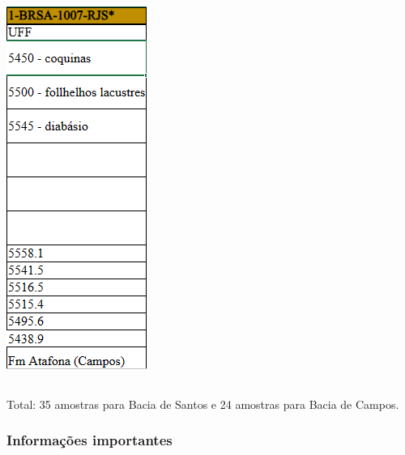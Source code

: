 \documentclass[aspectratio=169]{beamer} %
\begin{document}
{{\begin{frame}
\begin{columns}[c]
			\centering
			\includegraphics[scale=0.4]{images/amostragem1BRSA1007RJS.png} %
		  \end{columns}
    Total: 35 amostras para Bacia de Santos e 24 amostras para Bacia de Campos. 

\end{frame} 
}


{
\begin{frame}
	\frametitle{Informações importantes}


\end{frame}}}
\end{document}
